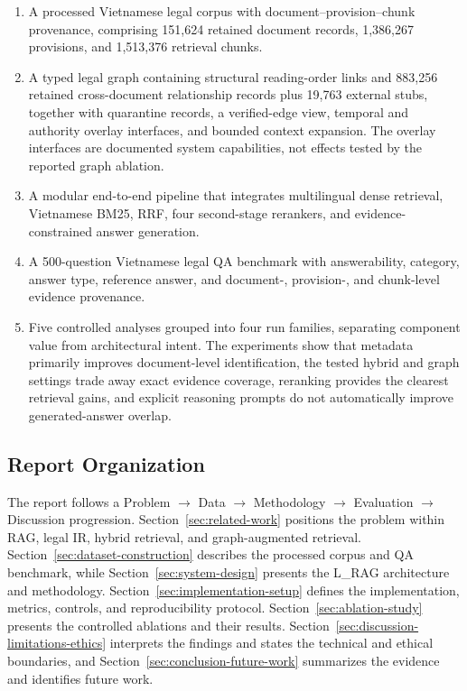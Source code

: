 \begin{enumerate}
    \item A processed Vietnamese legal corpus with document--provision--chunk
    provenance, comprising 151,624 retained document records, 1,386,267
    provisions, and 1,513,376 retrieval chunks.
    \item A typed legal graph containing structural reading-order links and
    883,256 retained cross-document relationship records plus 19,763 external
    stubs, together with quarantine records, a verified-edge view, temporal
    and authority overlay interfaces, and bounded context expansion. The
    overlay interfaces are documented system capabilities, not effects tested
    by the reported graph ablation.
    \item A modular end-to-end pipeline that integrates multilingual dense
    retrieval, Vietnamese BM25, RRF, four second-stage rerankers, and
    evidence-constrained answer generation.
    \item A 500-question Vietnamese legal QA benchmark with answerability,
    category, answer type, reference answer, and document-, provision-, and
    chunk-level evidence provenance.
    \item Five controlled analyses grouped into four run families, separating
    component value from architectural intent. The experiments show that
    metadata primarily improves document-level identification, the tested
    hybrid and graph settings trade away exact evidence coverage, reranking
    provides the clearest retrieval gains, and explicit reasoning prompts do
    not automatically improve generated-answer overlap.
\end{enumerate}

\subsection{Report Organization}
\label{sec:report-structure}

The report follows a Problem $\rightarrow$ Data $\rightarrow$ Methodology
$\rightarrow$ Evaluation $\rightarrow$ Discussion progression.
Section~\ref{sec:related-work} positions the problem within RAG, legal IR,
hybrid retrieval, and graph-augmented retrieval.
Section~\ref{sec:dataset-construction} describes the processed corpus and QA
benchmark, while Section~\ref{sec:system-design} presents the L\_RAG
architecture and methodology. Section~\ref{sec:implementation-setup} defines
the implementation, metrics, controls, and reproducibility protocol.
Section~\ref{sec:ablation-study} presents the controlled ablations and their
results. Section~\ref{sec:discussion-limitations-ethics} interprets the
findings and states the technical and ethical boundaries, and
Section~\ref{sec:conclusion-future-work} summarizes the evidence and
identifies future work.
